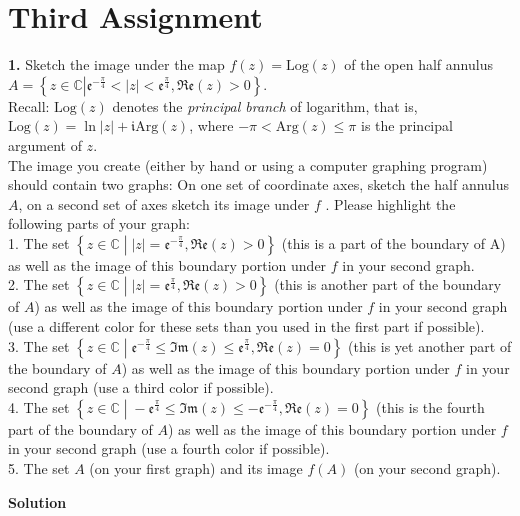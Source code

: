 \documentclass[11pt]{amsart}
\newcommand{\dsp}{\displaystyle}
\newcommand{\BBC}{\mathbb{C}}\newcommand{\mi}{\mathfrak{i}}
\begin{document}
\section{Third Assignment}
\textbf{1.} Sketch the image under the map $f(z)=\textrm{Log}(z)$ of the open half annulus 
$\dsp A=\left\{z\in\BBC\left| 
\mathfrak{e}^{-\frac{\pi}{4}}<|z|<\mathfrak{e}^{\frac{\pi}{4}},\mathfrak{Re}
(z)>0\right.\right\} $.\\Recall: $\textrm{Log}(z)$ denotes the \textit{principal branch} 
of logarithm, that is, $\textrm{Log}(z)=\ln⁡|z|+\mi \textrm{Arg}(z)$, 
where $\dsp -\pi<\textrm{Arg}(z)\leq \pi$ is the principal argument of $z$.\\
The image you create (either by hand or using a computer graphing program) should contain two graphs: On one set of 
coordinate axes, sketch the half annulus $A$, on a second set of axes sketch its image 
under $f$ . Please highlight the following 
parts of your graph:\\
1. The set $\dsp \left\{z\in\BBC\;\left|\;|z| =\mathfrak{e}^{-\frac{\pi}{4}}, 
\mathfrak{Re}(z)>0\right.\right\}$ (this is a part of the boundary
of A) as well as the image of this boundary portion under $f$ in your second graph.\\
2. The set $\dsp \left\{z\in\BBC\;\left|\;|z| 
=\mathfrak{e}^{\frac{\pi}{4}},\mathfrak{Re}(z)>0\right.\right\}$ (this is another part of 
the 
boundary of $A$) as well as the image of this boundary portion under $f$ in your second 
graph (use a different color for these sets 
than you used in the first part if possible).\\
3. The set $\left\{z \in 
\BBC\;\left|\;\mathfrak{e}^{-\frac{\pi}{4}}\leq\mathfrak{Im}(z)\leq\mathfrak{e}^{\frac{\pi
} { 4 } }, \mathfrak{Re}(z)=0\right.\right\}$ (this is yet another part of the boundary 
of $A$) as well as the image of this 
boundary portion under $f$ in your second 
graph (use a third color if possible).\\
4. The set $\dsp \left\{z \in \BBC\;\left|\;-\mathfrak{e}^{\frac{\pi}{4}}\leq 
\mathfrak{Im}(z)\leq-\mathfrak{e}^{-\frac{\pi}{4}},
\mathfrak{Re}(z) = 0\right.\right\}$ (this is the fourth part of the boundary of $A$) as 
well 
as the image of this boundary portion under 
$f$ in your second graph (use a fourth color if possible).\\
5. The set $A$ (on your first graph) and its image $f(A)$ (on your second graph).
\begin{center}
\textbf{Solution}
\end{center}
\end{document}
